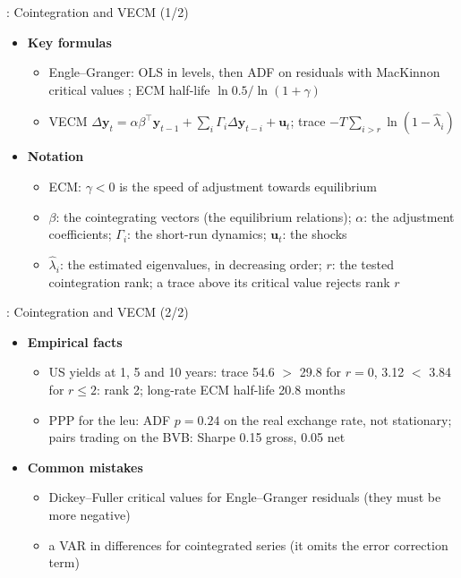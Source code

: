 \begin{frame}{: Cointegration and VECM (1/2)}
\itemsize{\footnotesize}
\begin{itemize}
    \item \textbf{Key formulas}
    \begin{itemize}
        \item Engle--Granger: OLS in levels, then ADF on residuals with MacKinnon critical values ; ECM half-life $\ln 0.5/\ln(1 + \gamma)$
        \item VECM $\Delta\mathbf y_t = \alpha\beta^\top\mathbf y_{t-1} + \sum_i\Gamma_i\Delta\mathbf y_{t-i} + \mathbf u_t$; trace $-T\sum_{i>r}\ln(1 - \hat\lambda_i)$ 
    \end{itemize}
    \item \textbf{Notation}
    \begin{itemize}
        \item ECM: $\gamma < 0$ is the speed of adjustment towards equilibrium
        \item $\beta$: the cointegrating vectors (the equilibrium relations); $\alpha$: the adjustment coefficients; $\Gamma_i$: the short-run dynamics; $\mathbf u_t$: the shocks
        \item $\hat\lambda_i$: the estimated eigenvalues, in decreasing order; $r$: the tested cointegration rank; a trace above its critical value rejects rank $r$
    \end{itemize}
\end{itemize}
\end{frame}

\begin{frame}{: Cointegration and VECM (2/2)}
\itemsize{\footnotesize}
\begin{itemize}
    \item \textbf{Empirical facts}
    \begin{itemize}
        \item US yields at 1, 5 and 10 years: trace 54.6 $>$ 29.8 for $r = 0$, 3.12 $<$ 3.84 for $r \le 2$: rank 2; long-rate ECM half-life 20.8 months
        \item PPP for the leu: ADF $p = 0.24$ on the real exchange rate, not stationary; pairs trading on the BVB: Sharpe 0.15 gross, 0.05 net
    \end{itemize}
    \item \textbf{Common mistakes}
    \begin{itemize}
        \item Dickey--Fuller critical values for Engle--Granger residuals (they must be more negative)
        \item a VAR in differences for cointegrated series (it omits the error correction term)
    \end{itemize}
\end{itemize}
\end{frame}


